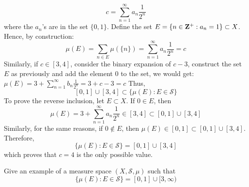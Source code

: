 \begin{solution}
    $$c = \sum_{n=1}^{\infty}a_n\frac{1}{2^n}$$
    where the $a_n$'s are in the set $\{0, 1\}$. Define the set $E = \{n \in \mathbf{Z}^+ : a_n =1\} \subset X$. Hence, by construction:
    $$\mu(E) = \sum_{n \in E}\mu(\{n\}) = \sum_{n=1}^{\infty}a_n\frac{1}{2^n} = c$$
    Similarly, if $c \in [3,4]$, consider the binary expansion of $c - 3$, construct the set $E$ as previously and add the element 0 to the set, we would get:
    $\mu(E) = 3 + \sum_{n=1}^{\infty}b_n \frac{1}{2^n} = 3 + c - 3 = c$
    Thus, 
    $$[0,1] \cup [3, 4] \subset \{\mu(E) : E\in\mathcal{S}\}$$
    To prove the reverse inclusion, let $E \subset X$. If $0 \in E$, then
    $$\mu(E) = 3 + \sum_{n=1}^{\infty}a_n\frac{1}{2^n} \in [3, 4] \subset [0,1] \cup [3, 4]$$
    Similarly, for the same reasons, if $0 \notin E$, then $\mu(E) \in [0,1] \subset [0,1] \cup [3, 4]$. Therefore,
    $$\{\mu(E) : E\in\mathcal{S}\} = [0,1] \cup [3, 4]$$
    which proves that $c = 4$ is the only possible value.\\
\end{solution} 

\begin{exercise}
    Give an example of a measure space $(X, \mathcal{S}, \mu)$ such that
    $$\{\mu(E) : E\in\mathcal{S}\} = [0,1] \cup [3, \infty)$$ \\
\end{exercise}

